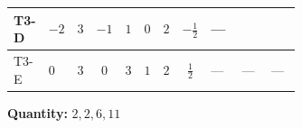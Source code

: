 \documentclass[8pt]{article}
\begin{document}
\begin{landscape}
\begin{longtable}{@{}llcccccc >{\raggedright\arraybackslash}p{0.21\linewidth} >{\raggedright\arraybackslash}p{0.21\linewidth} >{\raggedright\arraybackslash}p{0.21\linewidth}@{}}
\midrule
T3-D & $-2$ & $3$ & $-1$ & $1$ & $0$ & $2$ & $-\frac{1}{2}$ & --- & \scriptsize\adjustbox{max width=\linewidth}{$\begin{gathered} - \frac{11 \cdot 3^{\frac{3}{4}} i g_{2}^{2} \overline{y_{1}} \overline{y_{2}}}{8 MF}\end{gathered}$} & \scriptsize\adjustbox{max width=\linewidth}{$\begin{gathered} - \frac{3^{\frac{3}{4}} i lambda12Inv1 \overline{y_{1}} \overline{y_{2}}}{6 MF}\end{gathered}$} \\
\midrule
T3-E & $0$ & $3$ & $0$ & $3$ & $1$ & $2$ & $\frac{1}{2}$ & --- & --- & --- \\
\midrule
\bottomrule
\end{longtable}
\clearpage
\noindent\textbf{Quantity: }$\mathrm{2,2,6,11}$\par\smallskip

\end{landscape}
\end{document}
